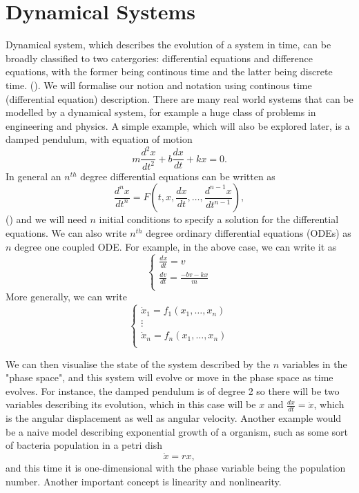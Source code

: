 \documentclass{statsmsc}
\begin{document}
\section{Dynamical Systems}
Dynamical system, which describes the evolution of a system in time, can be broadly classified to two catergories: differential equations and difference equations, with the former being continous time and the latter being discrete time. (\cite{strogatz_2019}). 
We will formalise our notion and notation using continous time (differential equation) description.
There are many real world systems that can be modelled by a dynamical system, for example a huge class of problems in engineering and physics. 
A simple example, which will also be explored later, is a damped pendulum, with equation of motion
$$
m\frac{d^2x}{dt^2}+b\frac{dx}{dt}+kx=0.
$$
In general an $n^{th}$ degree differential equations can be written as 
$$
\frac{d^{n} x}{d t^{n}}=F\left(t, x, \frac{d x}{d t}, \ldots, \frac{d^{n-1} x}{d t^{n-1}}\right),
$$
(\cite{glendinning_1994}) and we will need $n$ initial conditions to specify a solution for the differential equations.
We can also write $n^{th}$ degree ordinary differential equations (ODEs) as $n$ degree one coupled ODE. 
For example, in the above case, we can write it as 
$$
\begin{cases}
  \frac{dx}{dt} = v\\
  \frac{dv}{dt} = \frac{-bv-kx}{m}\\
\end{cases}
$$
More generally, we can write 
$$
\begin{cases}
  \dot{x}_1=f_1(x_1, \dots, x_n)\\ 
  \vdots\\
  \dot{x}_n=f_n(x_1, \dots, x_n)\\ 
\end{cases}
$$

We can then visualise the state of the system described by the $n$ variables in the "phase space", and this system will evolve or move in the phase space as time evolves. 
For instance, the damped pendulum is of degree 2 so there will be two variables describing its evolution, which in this case will be $x$ and $\frac{dx}{dt}=\dot{x}$, which is the angular displacement as well as angular velocity.
Another example would be a naive model describing exponential growth of a organism, such as some sort of bacteria population in a petri dish
$$
\dot{x}=rx,
$$
and this time it is one-dimensional with the phase variable being the population number.
Another important concept is linearity and nonlinearity. 
\end{document}
